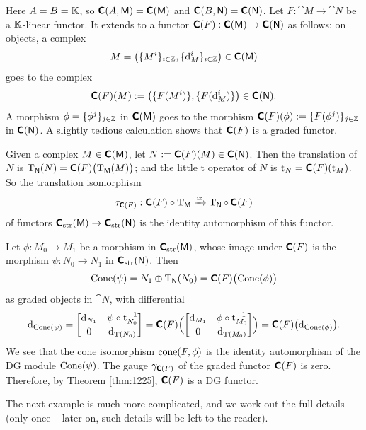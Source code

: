 \begin{exa} \label{exa:1117}
Here $A = B = \K$, so 
$\dcat{C}(A, \cat{M}) = \dcat{C}(\cat{M})$
and $\dcat{C}(B, \cat{N}) = \dcat{C}(\cat{N})$. 
Let $F : \cat{M} \to \cat{N}$ be a $\K$-linear functor. It extends to a functor 
$\dcat{C}(F) : \dcat{C}(\cat{M}) \to \dcat{C}(\cat{N})$
as follows: on objects, a complex 
\[ M = \bigl( \{ M^i \}_{i \in \Z}, \{ \d_M^i \}_{i \in \Z} \bigr) 
\in \dcat{C}(\cat{M}) \]
goes to the complex 
\[ \dcat{C}(F)(M) := \bigl( \{ F(M^i) \}, \{ F(\d_M^i) \} \bigr) \in 
\dcat{C}(\cat{N}) . \]
A morphism $\phi = \{ \phi^j \}_{j \in \Z}$ in $\dcat{C}(\cat{M})$ goes 
to the morphism 
$\dcat{C}(F)(\phi) : = \lb \{ F(\phi^j) \}_{j \in \Z}$
in $\dcat{C}(\cat{N})$. A slightly tedious calculation shows that $\dcat{C}(F)$ 
is a graded functor.

Given a complex $M \in \dcat{C}(\cat{M})$, let 
$N := \dcat{C}(F)(M) \in \dcat{C}(\cat{N})$.
Then the translation of $N$ is 
$\opn{T}_{\cat{N}}(N) = \dcat{C}(F) \bigl( \opn{T}_{\cat{M}}(M) \bigr)$;
and the little t operator of $N$ is 
$\opn{t}_{N} = \dcat{C}(F)(\opn{t}_{M})$. 
So the translation isomorphism 
\[ \tau_{\dcat{C}(F)} :  \dcat{C}(F) \circ \opn{T}_{\cat{M}} \iso 
\opn{T}_{\cat{N}} \circ \, \dcat{C}(F) \]
of functors 
$\dcat{C}_{\mrm{str}}(\cat{M}) \to \dcat{C}_{\mrm{str}}(\cat{N})$
is the identity automorphism of this functor. 

Let $\phi : M_0 \to M_1$ be a morphism in 
$\dcat{C}_{\mrm{str}}(\cat{M})$, 
whose image under $\dcat{C}(F)$ is the morphism 
$\psi : N_0 \to N_1$  in $\dcat{C}_{\mrm{str}}(\cat{N})$.
Then 
\[ \opn{Cone}(\psi) = N_1 \oplus \opn{T}_{\cat{N}}(N_0) =
\dcat{C}(F) \bigl( \opn{Cone}(\phi) \bigr)  \]
as graded objects in $\cat{N}$, with differential 
\[ \d_{\opn{Cone}(\psi)} = 
\bmat{\d_{N_1} & \psi \circ \opn{t}_{N_0}^{-1} \\[0.2em] 0 & \d_{\opn{T}(N_0)}} 
= \dcat{C}(F) \Bigl( 
\bmat{\d_{M_1} & \phi \circ \opn{t}_{M_0}^{-1} \\[0.2em] 0 & \d_{\opn{T}(M_0)}}
\Bigr) = \dcat{C}(F) \bigl( \d_{\opn{Cone}(\phi)} \bigr) . \]
We see that the cone isomorphism $\opn{cone}(F, \phi) $ is the identity 
automorphism of the DG module $\opn{Cone}(\psi)$. The gauge $\ga_{\dcat{C}(F)}$ 
of the graded functor $\dcat{C}(F)$ is zero. Therefore, by Theorem 
\ref{thm:1225}, $\dcat{C}(F)$ is a DG functor. 
\end{exa}

The next example is much more complicated, and we work out the full details 
(only once -- later on, such details will be left to the reader). 

